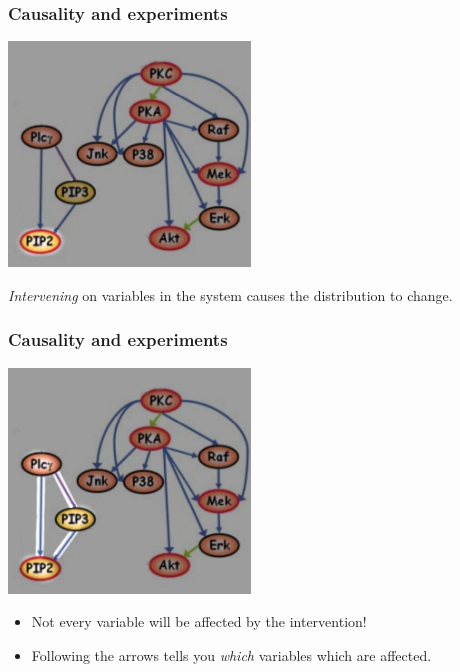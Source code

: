 \documentclass{beamer}
\begin{document}
\begin{frame}
\frametitle{Causality and experiments}
\begin{center}
\includegraphics[scale = 0.5]{../images/fig01_01.png}
\end{center}

\emph{Intervening} on variables in the system causes the distribution to change.


\end{frame}

\begin{frame}
\frametitle{Causality and experiments}

\begin{center}
\includegraphics[scale = 0.5]{../images/fig01_02.png}
\end{center}

\begin{itemize}
\item Not every variable will be affected by the intervention!
\item Following the arrows tells you \emph{which} variables which are affected.
\end{itemize}

\end{frame}
\end{document}
